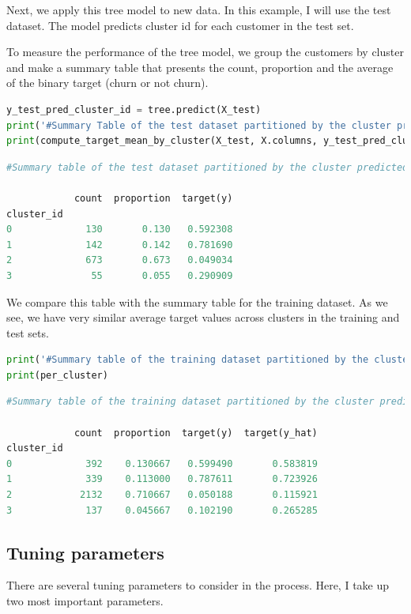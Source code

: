 \documentclass{article}
\begin{document}
Next, we apply this tree model to new data. In this example, I will use the test dataset. The model predicts cluster id for each customer in the test set. 

To measure the performance of the tree model, we group the customers by cluster and make a summary table that presents the count, proportion and the average of the binary target (churn or not churn).

\begin{lstlisting}[language=Python]
y_test_pred_cluster_id = tree.predict(X_test)
print('#Summary Table of the test dataset partitioned by the cluster predicted by the tree model'\n)
print(compute_target_mean_by_cluster(X_test, X.columns, y_test_pred_cluster_id, y_test))
\end{lstlisting}

\begin{lstlisting}[language=Python,numbers=none]
#Summary table of the test dataset partitioned by the cluster predicted by the tree model

            count  proportion  target(y)
cluster_id                              
0             130       0.130   0.592308
1             142       0.142   0.781690
2             673       0.673   0.049034
3              55       0.055   0.290909
\end{lstlisting}

We compare this table with the summary table for the training dataset. As we see, we have very similar average target values across clusters in the training and test sets.

\begin{lstlisting}[language=Python]
print('#Summary table of the training dataset partitioned by the cluster predicted by the random forest model\n')
print(per_cluster)
\end{lstlisting}

\begin{lstlisting}[language=Python,numbers=none]
#Summary table of the training dataset partitioned by the cluster predicted by the random forest model

            count  proportion  target(y)  target(y_hat)
cluster_id                                             
0             392    0.130667   0.599490       0.583819
1             339    0.113000   0.787611       0.723926
2            2132    0.710667   0.050188       0.115921
3             137    0.045667   0.102190       0.265285
\end{lstlisting}

\subsection{Tuning parameters}
There are several tuning parameters to consider in the process. Here, I take up two most important parameters.
\end{document}
